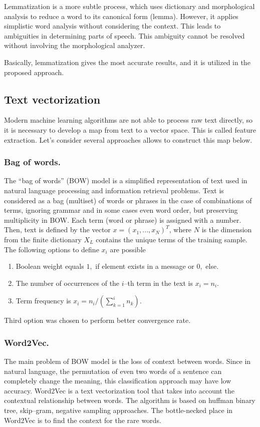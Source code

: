\documentclass[12pt]{jpconf}
\begin{document}
Lemmatization is a more subtle process, which uses dictionary and morphological analysis to reduce a word to its canonical form (lemma). However, it applies simplistic word analysis without considering the context. This leads to ambiguities in determining parts of speech. This ambiguity cannot be resolved without involving the morphological analyzer.

Basically, lemmatization gives the most accurate results, and it is utilized in the proposed approach.

\subsection{Text vectorization}
Modern machine learning algorithms are not able to process raw text directly, so it is necessary to develop a map from text to a vector space. This is called feature extraction. 
Let's consider several approaches allows to construct this map below.

\subsubsection*{Bag of words.}
The ``bag of words'' (BOW) model is a simplified representation of text used in natural language processing and information retrieval problems. Text is considered as a bag (multiset) of words or phrases in the case of combinations of terms, ignoring grammar and in some cases even word order, but preserving multiplicity in BOW. Each term (word or phrase) is assigned with a number. Then, text is defined by the vector $x=(x_1,..., x_N)^T$, where $N$ is the dimension from the finite dictionary $X_L$ contains the unique terms of the training sample. The following options to define $x_i$ are possible
\begin{enumerate}
\item Boolean weight equals $1,$ if element exists in a message or 
$0,$ else.
\item The number of occurrences of the $i$--th term in the text is 
$x_i = n_i.$
\item Term frequency is $x_i = n_i\slash\left(\sum\limits_{k=1}^i n_k\right).$
\end{enumerate}
Third option was chosen to perform better convergence rate.

\subsubsection*{Word2Vec.}
The main problem of BOW model is the loss of context between words. Since in natural language, the permutation of even two words of a sentence can completely change the meaning, this classification approach may have low accuracy.
Word2Vec is a text vectorization tool that takes into account the contextual relationship between words. The algorithm is based on huffman binary tree, skip--gram, negative sampling approaches. The bottle-necked place in Word2Vec is to find the context for the rare words.
\end{document}
